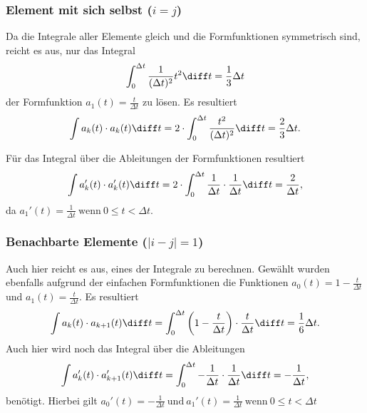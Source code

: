 \subsubsection{Element mit sich selbst ($i = j$)} %
Da die Integrale aller Elemente gleich und die Formfunktionen symmetrisch sind, reicht es aus, nur das Integral
\begin{equation}
    \int_{0}^{\Delta t} \frac{1}{(\Delta t)^2} t^2 \diff t = \frac{1}{3} \Delta t
\end{equation}
der Formfunktion $ a_1(t) = \frac{t}{\Delta t} $ zu lösen.
Es resultiert
\begin{equation}
    \int a_k(t) \cdot a_k(t) \diff t = 2 \cdot \int_{0}^{\Delta t} \frac{t^2}{(\Delta t)^2} \diff t = \frac{2}{3} \Delta t.
\end{equation}

Für das Integral über die Ableitungen der Formfunktionen resultiert
\begin{equation}
    \int a_k'(t) \cdot a_k'(t) \diff t = 2 \cdot \int_{0}^{\Delta t} \frac{1}{\Delta t} \cdot \frac{1}{\Delta t} \diff t = \frac{2}{\Delta t},
\end{equation}
da $a_1'(t)= \frac{1}{\Delta t} \ \mbox{wenn} \ 0 \leq t < \Delta t$.

\subsubsection{Benachbarte Elemente ($|i - j| = 1$)}
Auch hier reicht es aus, eines der Integrale zu berechnen. 
Gewählt wurden ebenfalls aufgrund der einfachen Formfunktionen die Funktionen $a_0(t) = 1 - \frac{t}{\Delta t}$ und $a_1(t) = \frac{t}{\Delta t}$.
Es resultiert
\begin{equation}
    \int a_k(t) \cdot a_{k+1}(t) \diff t = \int_{0}^{\Delta t} \left(1 - \frac{t}{\Delta t}\right) \cdot \frac{t}{\Delta t} \diff t = \frac{1}{6} \Delta t.
\end{equation}
Auch hier wird noch das Integral über die Ableitungen 
\begin{equation}
    \int a_k'(t) \cdot a_{k+1}'(t) \diff t = \int_{0}^{\Delta t} -\frac{1}{\Delta t} \cdot \frac{1}{\Delta t} \diff t = -\frac{1}{\Delta t},
\end{equation}
benötigt.
Hierbei gilt $a_0'(t)= -\frac{1}{\Delta t} \ \mbox{und} \ a_1'(t)= \frac{1}{\Delta t} \ \mbox{wenn} \ 0 \leq t < \Delta t$

